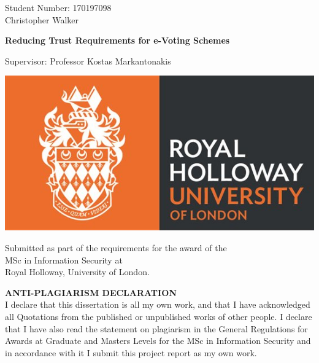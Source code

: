 

\hypersetup{pageanchor=false} %
\begin{titlepage}

    \begin{center}
        {\large Student Number: 170197098 \\ Christopher Walker}

        \vspace*{1em}

        {\Huge\bfseries Reducing Trust Requirements for e-Voting Schemes}

        \vspace*{1em}

        {\large Supervisor:  Professor Kostas Markantonakis}

        \vspace*{1em}

        \includegraphics[scale=0.5]{lib/rhuol_logo.jpg}

        \vspace*{2em}

        \large Submitted as part of the requirements for the award of the \\
        MSc in Information Security at \\
        Royal Holloway, University of London.

    \end{center}

    \vspace*{\fill}


    \noindent \textbf{ANTI-PLAGIARISM DECLARATION} \\
    \noindent I declare that this dissertation is all my own work, and that I have acknowledged all Quotations from the published or unpublished works of other people. I declare that I have also read the statement on plagiarism in the General Regulations for Awards at Graduate and Masters Levels for the MSc in Information Security and in accordance with it I submit this project report as my own work.


\end{titlepage}
